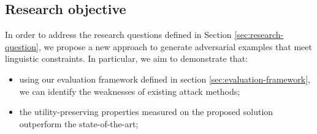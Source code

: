 
\subsection{Research objective}\label{subsec:research-objective}

In order to address the research questions defined in Section \ref{sec:research-question}, 
we propose a new approach to generate adversarial examples that meet linguistic constraints.
In particular, we aim to demonstrate that:
\begin{itemize}
    \item using our evaluation framework defined in section \ref{sec:evaluation-framework}, we can identify the weaknesses of existing attack methods;
    \item the utility-preserving properties measured on the proposed solution outperform the state-of-the-art;
\end{itemize}
 

